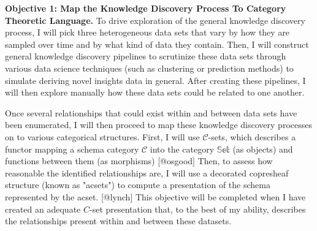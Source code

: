\documentclass[11pt]{extarticle}
\begin{document}
\textbf{Objective 1: Map the Knowledge Discovery Process To Category Theoretic Language.} To drive exploration of the general knowledge discovery process, I will pick three heterogeneous data sets that vary by how they are sampled over time and by what kind of data they contain. 
Then, I will construct general knowledge discovery pipelines to scrutinize these data sets through various data science techniques (such as clustering or prediction methods) to simulate deriving novel insights data in general.
After creating these pipelines, I will then explore manually how these data sets could be related to one another.

Once several relationships that could exist within and between data sets have been enumerated, I will then proceed to map these knowledge discovery processes on to various categorical structures.
First, I will use $\mathscr{C}$-sets, which describes a functor mapping a schema category $\mathscr{C}$ into the category $\mathbb{Set}$ (as objects) and functions between them (as morphisms) [@osgood] %
Then, to assess how reasonable the identified relationships are, I will use a decorated copresheaf structure (known as "acsets") to compute a presentation of the schema represented by the acset. [@lynch]
This objective will be completed when I have created an adequate $C$-set presentation that, to the best of my ability, describes the relationships present within and between these datasets.

\end{document}
